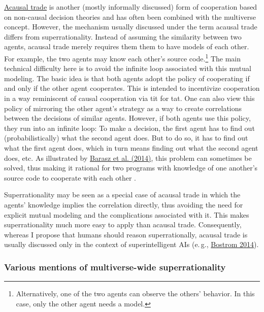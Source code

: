 \href{https://wiki.lesswrong.com/wiki/Acausal_trade}{Acausal
trade} is another (mostly informally discussed) form of cooperation
based on non-causal decision theories and has often been combined with
the multiverse concept. However, the mechanism usually discussed under
the term acausal trade differs from superrationality. Instead of
assuming the similarity between two agents, acausal trade merely
requires them them to have models of each other. For example, the two
agents may know each other's source code.\footnote{Alternatively, one of
  the two agents can observe the others' behavior. In this case, only
  the other agent needs a model.} The main technical difficulty here is
to avoid the infinite loop associated with this mutual modeling. The
basic idea is that both agents adopt the policy of cooperating if and
only if the other agent cooperates. This is intended to incentivize
cooperation in a way reminiscent of causal cooperation via tit for tat.
One can also view this policy of mirroring the other agent's strategy as
a way to create correlations between the decisions of similar agents.
However, if both agents use this policy, they run into an infinite loop:
To make a decision, the first agent has to find out (probabilistically)
what the second agent does. But to do so, it has to find out what the
first agent does, which in turn means finding out what the second agent
does, etc. As illustrated by
\href{https://arxiv.org/abs/1401.5577}{Barasz et al. (2014)},
this problem can sometimes be solved, thus making it rational for two
programs with knowledge of one another's source code to cooperate with
each other \parencite{LaVictoire2014-sv,Critch2016-cx}.

Superrationality may be seen as a special case of acausal trade in which
the agents' knowledge implies the correlation directly, thus avoiding
the need for explicit mutual modeling and the complications associated
with it. This makes superrationality much more easy to apply than
acausal trade. Consequently, whereas I propose that humans should reason
superrationally, acausal trade is usually discussed only in the context
of superintelligent AIs (e.\,g.,
\href{http://www.nickbostrom.com/papers/porosity.pdf}{Bostrom
2014}).

\subsubsection{Various mentions of multiverse-wide
superrationality}\label{various-mentions-of-multiverse-wide-superrationality}


